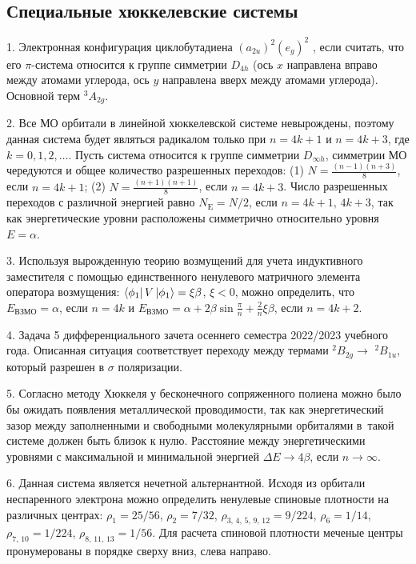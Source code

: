 \subsection{Специальные хюккелевские системы}
1. Электронная конфигурация циклобутадиена $(a_{2u})^2(e_g)^2$ , если считать, что его $\pi$-система относится к группе симметрии $D_{4h}$ (ось $x$ направлена вправо между атомами углерода, ось $y$ направлена вверх между атомами углерода). Основной терм $^3A_{2g}$.\par
2. Все МО орбитали в линейной хюккелевской системе невырождены, поэтому данная система будет являться радикалом только при $n=4k+1$ и $n=4k+3$, где $k=0,1,2,\ldots$. Пусть система относится к группе симметрии $D_{\infty h}$, симметрии МО чередуются и общее количество разрешенных переходов: (1) $N=\frac{(n-1)(n+3)}{8}$, если $n=4k+1$; (2) $N=\frac{(n+1)(n+1)}{8}$, если $n=4k+3$. Число разрешенных переходов с различной энергией равно $N_{\text{E}}=N/2$, если $n = 4k+1,\,4k+3$, так как энергетические уровни расположены симметрично относительно уровня $E=\alpha$.\par
3. Используя вырожденную теорию возмущений для учета индуктивного заместителя с помощью единственного ненулевого матричного элемента оператора возмущения: $\bra{\phi_1} V \ket{\phi_1}=\xi \beta$, $\xi<0$, можно определить, что $E_{\text{ВЗМО}}=\alpha$, если $n=4k$ и $E_{\text{ВЗМО}}=\alpha+2\beta \sin{\frac{\pi}{n}}+\frac{2}{n}\xi \beta$, если $n=4k+2$.\par
4. Задача 5 дифференциального зачета осеннего семестра 2022/2023 учебного года. Описанная ситуация соответствует переходу между термами $^2B_{2g} \rightarrow\,\,^2B_{1u}$, который разрешен в $\sigma$ поляризации.\par
5. Согласно методу Хюккеля у бесконечного сопряженного полиена можно было бы ожидать появления металлической проводимости, так как энергетический зазор между заполненными и свободными молекулярными орбиталями в~такой системе должен быть близок к нулю. Расстояние между энергетическими уровнями с максимальной и минимальной энергией $\Delta E \rightarrow 4\beta$, если $n \rightarrow \infty$.  \par
6. Данная система является нечетной альтернантной. Исходя из орбитали неспаренного электрона можно определить ненулевые спиновые плотности на различных центрах: $\rho_1 = 25/56$, $\rho_2 = 7/32$, $\rho_{3,\,4,\,5,\,9,\,12} = 9/224$, $\rho_6 = 1/14$, $\rho_{7,\,10} = 1/224$,  $\rho_{8,\,11,\,13} = 1/56$. Для расчета спиновой плотности меченые центры пронумерованы в порядке сверху вниз, слева направо.\par
